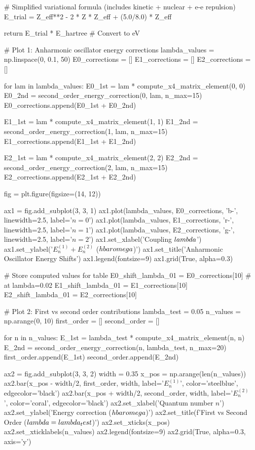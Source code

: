 \documentclass[a4paper, 11pt]{article}
\begin{document}
\begin{pycode}
    # Simplified variational formula (includes kinetic + nuclear + e-e repulsion)
    E_trial = Z_eff**2 - 2 * Z * Z_eff + (5.0/8.0) * Z_eff

    return E_trial * E_hartree  # Convert to eV

# Plot 1: Anharmonic oscillator energy corrections
lambda_values = np.linspace(0, 0.1, 50)
E0_corrections = []
E1_corrections = []
E2_corrections = []

for lam in lambda_values:
    E0_1st = lam * compute_x4_matrix_element(0, 0)
    E0_2nd = second_order_energy_correction(0, lam, n_max=15)
    E0_corrections.append(E0_1st + E0_2nd)

    E1_1st = lam * compute_x4_matrix_element(1, 1)
    E1_2nd = second_order_energy_correction(1, lam, n_max=15)
    E1_corrections.append(E1_1st + E1_2nd)

    E2_1st = lam * compute_x4_matrix_element(2, 2)
    E2_2nd = second_order_energy_correction(2, lam, n_max=15)
    E2_corrections.append(E2_1st + E2_2nd)

fig = plt.figure(figsize=(14, 12))

ax1 = fig.add_subplot(3, 3, 1)
ax1.plot(lambda_values, E0_corrections, 'b-', linewidth=2.5, label='$n=0$')
ax1.plot(lambda_values, E1_corrections, 'r-', linewidth=2.5, label='$n=1$')
ax1.plot(lambda_values, E2_corrections, 'g-', linewidth=2.5, label='$n=2$')
ax1.set_xlabel('Coupling $\\lambda$')
ax1.set_ylabel('$E_n^{(1)} + E_n^{(2)}$ ($\\hbar\\omega$)')
ax1.set_title('Anharmonic Oscillator Energy Shifts')
ax1.legend(fontsize=9)
ax1.grid(True, alpha=0.3)

# Store computed values for table
E0_shift_lambda_01 = E0_corrections[10]  # at lambda=0.02
E1_shift_lambda_01 = E1_corrections[10]
E2_shift_lambda_01 = E2_corrections[10]

# Plot 2: First vs second order contributions
lambda_test = 0.05
n_values = np.arange(0, 10)
first_order = []
second_order = []

for n in n_values:
    E_1st = lambda_test * compute_x4_matrix_element(n, n)
    E_2nd = second_order_energy_correction(n, lambda_test, n_max=20)
    first_order.append(E_1st)
    second_order.append(E_2nd)

ax2 = fig.add_subplot(3, 3, 2)
width = 0.35
x_pos = np.arange(len(n_values))
ax2.bar(x_pos - width/2, first_order, width, label='$E_n^{(1)}$',
        color='steelblue', edgecolor='black')
ax2.bar(x_pos + width/2, second_order, width, label='$E_n^{(2)}$',
        color='coral', edgecolor='black')
ax2.set_xlabel('Quantum number $n$')
ax2.set_ylabel('Energy correction ($\\hbar\\omega$)')
ax2.set_title(f'First vs Second Order ($\\lambda={lambda_test}$)')
ax2.set_xticks(x_pos)
ax2.set_xticklabels(n_values)
ax2.legend(fontsize=9)
ax2.grid(True, alpha=0.3, axis='y')


\end{pycode}
\end{document}
